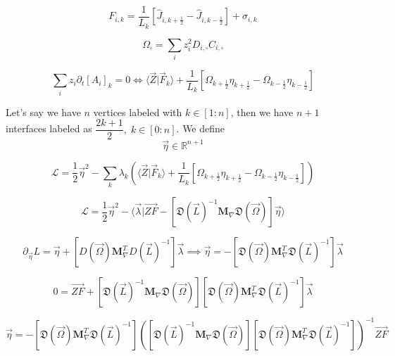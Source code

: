 \documentclass[aps,12pt]{revtex4}
\newcommand{\half}{\frac{1}{2}}
\begin{document}
\begin{equation}
	F_{i,k} =  \dfrac{1}{L_k} \left[ \hat J_{i,k+\half} - \hat J_{i,k-\half} \right]  + \sigma_{i,k}
\end{equation}

\begin{equation}
	\Omega_{\square} = \sum_i z_i^2 D_{i,\square} C_{i,\square}
\end{equation}

\begin{equation}
	\sum_i z_i \partial_t [A_i]_k = 0 \iff \langle \vec Z \vert \vec F_k \rangle
	 + \dfrac{1}{L_k}\left[\Omega_{k+\half} \eta_{k+\half} - \Omega_{k-\half} \eta_{k-\half}\right]
\end{equation}

Let's say we have $n$ vertices labeled with $k\in[1:n]$, then we have $n+1$ interfaces labeled as $\dfrac{2k+1}{2},\;k\in[0:n]$.
We define
\begin{equation}
	\vec \eta \in \mathbb R ^ {n+1}
\end{equation}

\begin{equation}
	\mathcal L = \dfrac{1}{2} \vec \eta ^2 - \sum_k \lambda_k \left(\langle \vec Z \vert \vec F_k \rangle
	 + \dfrac{1}{L_k}\left[\Omega_{k+\half} \eta_{k+\half} - \Omega_{k-\half} \eta_{k-\half}\right]\right)
\end{equation}

\begin{equation}
	\mathcal L = \dfrac{1}{2} \vec \eta ^2 - \langle \vec \lambda \vert \vec{ZF} - 
	\left[\mathfrak D (\vec L)^{-1} \bm M_\nabla \mathfrak D(\vec\Omega)\right] \vec \eta \rangle
\end{equation}

\begin{equation}
	\partial_{\vec \eta} L = \vec \eta +\left[ D(\vec\Omega) \bm M_\nabla ^T D (\vec L)^{-1} \right] \vec \lambda
	\implies \vec \eta = - \left[ \mathfrak D(\vec\Omega) \bm M_\nabla ^T \mathfrak D (\vec L)^{-1} \right] \vec \lambda
\end{equation}

\begin{equation}
	0 = \vec {ZF} + \left[\mathfrak D (\vec L)^{-1} \bm M_\nabla \mathfrak D(\vec\Omega)\right] 
	\left[ \mathfrak D(\vec\Omega) \bm M_\nabla ^T \mathfrak D (\vec L)^{-1} \right] \vec \lambda
\end{equation}

\begin{equation}
	\vec \eta = - \left[ \mathfrak D(\vec\Omega) \bm M_\nabla ^T \mathfrak D (\vec L)^{-1} \right] \left( \left[\mathfrak D (\vec L)^{-1} \bm M_\nabla \mathfrak D(\vec\Omega)\right] \left[ \mathfrak D(\vec\Omega) \bm M_\nabla ^T \mathfrak D (\vec L)^{-1} \right]\right) ^{-1} \vec{ZF}
\end{equation}
\end{document}
